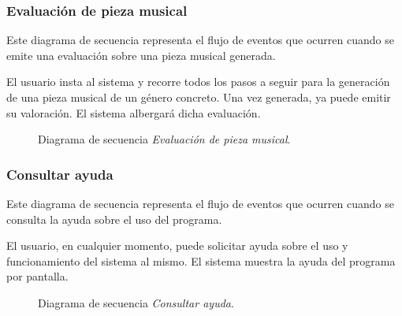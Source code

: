 \subsubsection{Evaluación de pieza musical}

Este diagrama de secuencia representa el flujo de eventos que ocurren cuando se emite una evaluación sobre una pieza musical generada.

El usuario insta al sistema y recorre todos los pasos a seguir para la generación de una pieza musical de un género concreto. Una vez generada, ya puede emitir su valoración. El sistema albergará dicha evaluación.

\begin{figure}[H]
  \centering
  
  \caption{Diagrama de secuencia \emph{Evaluación de pieza musical}.}
\end{figure}

\subsubsection{Consultar ayuda}

Este diagrama de secuencia representa el flujo de eventos que ocurren cuando se consulta la ayuda sobre el uso del programa.

El usuario, en cualquier momento, puede solicitar ayuda sobre el uso y funcionamiento del sistema al mismo. El sistema muestra la ayuda del programa por pantalla.

\begin{figure}[H]
  \centering
  
  \caption{Diagrama de secuencia \emph{Consultar ayuda}.}
\end{figure}